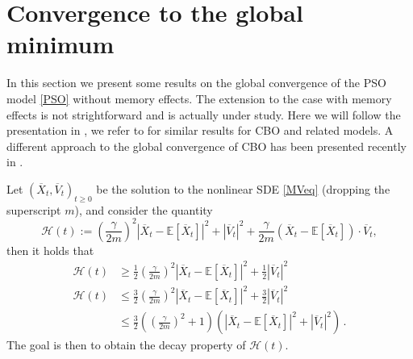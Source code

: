 \documentclass{ims9x6}
\newcommand{\EE}{\mathbb{E}}
\newcommand{\OV}{\overline{V}}
\newcommand{\OX}{\overline{X}}
\newcommand{\CH}{{\mathcal{H}}}
\begin{document}
\section{Convergence to the global minimum}
In this section we present some results on the global convergence of the PSO model \eqref{PSO} without memory effects. 
The extension to the case with memory effects is not strightforward and is actually under study. Here we will follow the presentation in \cite{HJK}, we refer to \cite{carrillo2018analytical,carrillo2019consensus,benfenati2021binary,fhps20-2,fornasier2021anisotropic} for similar results for CBO and related models. A different approach to the global convergence of CBO has been presented recently in \cite{fornasier2021consensusbased}.

Let $(\OX_t,\OV_t)_{t\geq 0}$ be the solution to the nonlinear SDE \eqref{MVeq} (dropping the superscript $m$), and
consider the quantity \[\CH(t):=(\frac{\gamma}{2m})^2|\OX_t-\EE[\OX_t]|^2+|\OV_t|^2+\frac{\gamma}{2m}(\OX_t-\EE[\OX_t])\cdot \OV_t,\] then it holds that
\begin{equation}
\begin{split}
\label{ineqH}
\CH(t)&\geq \frac{1}{2}(\frac{\gamma}{2m})^2|\OX_t-\EE[\OX_t]|^2+\frac{1}{2}|\OV_t|^2\\
\CH(t) &\leq \frac{3}{2}(\frac{\gamma}{2m})^2|\OX_t-\EE[\OX_t]|^2+\frac{3}{2}|\OV_t|^2\\
&\leq \frac{3}{2}((\frac{\gamma}{2m})^2+1)(|\OX_t-\EE[\OX_t]|^2+|\OV_t|^2)\,.
\end{split}
\end{equation}
The goal is then to obtain the decay property of $\CH(t)$.
\end{document}
